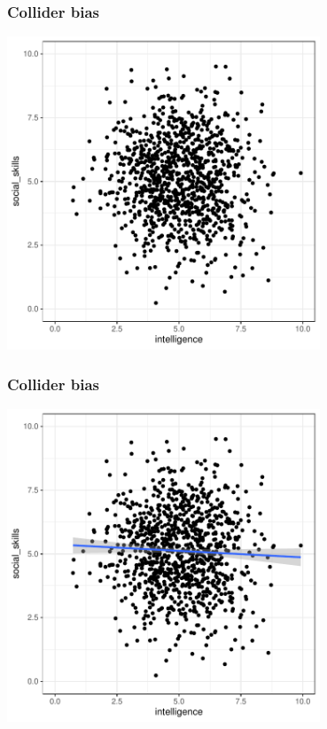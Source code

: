\documentclass[aspectratio=43]{beamer}
\begin{document}
\begin{frame}
\frametitle{Collider bias}
\centering

\includegraphics[width = 0.7\textwidth]{../img/collider1}

\end{frame}

\begin{frame}
\frametitle{Collider bias}
\centering

\includegraphics[width = 0.7\textwidth]{../img/collider2}

\end{frame}
\end{document}

